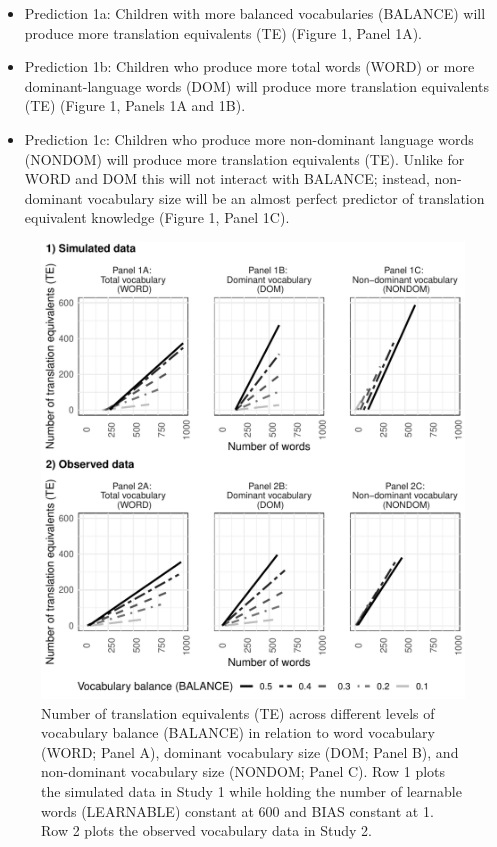 \documentclass[
  english,
  ,man,floatsintext]{apa6}
\providecommand{\tightlist}{%
  \setlength{\itemsep}{0pt}\setlength{\parskip}{0pt}}
\begin{document}
\begin{itemize}
\tightlist
\item
  Prediction 1a: Children with more balanced vocabularies (BALANCE) will produce more translation equivalents (TE) (Figure 1, Panel 1A).
\item
  Prediction 1b: Children who produce more total words (WORD) or more dominant-language words (DOM) will produce more translation equivalents (TE) (Figure 1, Panels 1A and 1B).
\item
  Prediction 1c: Children who produce more non-dominant language words (NONDOM) will produce more translation equivalents (TE). Unlike for WORD and DOM this will not interact with BALANCE; instead, non-dominant vocabulary size will be an almost perfect predictor of translation equivalent knowledge (Figure 1, Panel 1C).
\end{itemize}

\begin{figure}[H]

{\centering \includegraphics[width=1.1\linewidth,height=0.8\textheight]{paper_TE_bilingual_vocabulary_model_files/figure-latex/fig1-1} 

}

\caption{Number of translation equivalents (TE) across different levels of vocabulary balance (BALANCE) in relation to word vocabulary (WORD; Panel A), dominant vocabulary size (DOM; Panel B), and non-dominant vocabulary size (NONDOM; Panel C). Row 1 plots the simulated data in Study 1 while holding the number of learnable words (LEARNABLE) constant at 600 and BIAS constant at 1. Row 2 plots the observed vocabulary data in Study 2.}\label{fig:fig1}
\end{figure}
\end{document}
